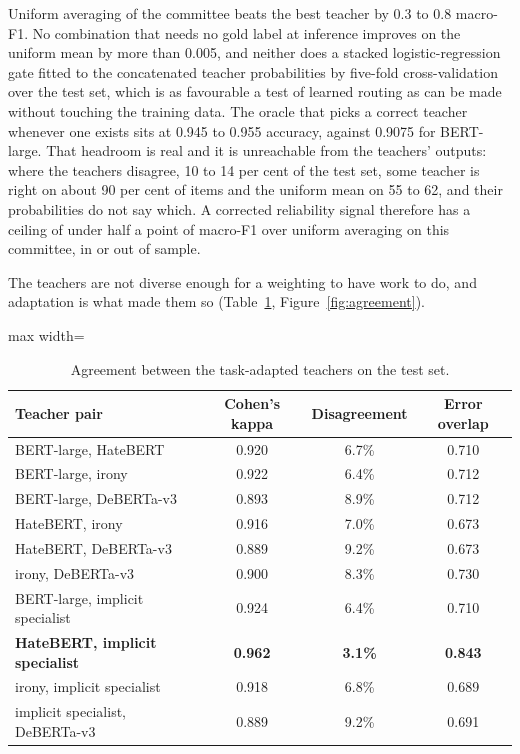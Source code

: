 Uniform averaging of the committee beats the best teacher by 0.3 to 0.8 macro-F1. No combination
that needs no gold label at inference improves on the uniform mean by more than 0.005, and neither
does a stacked logistic-regression gate fitted to the concatenated teacher probabilities by
five-fold cross-validation over the test set, which is as favourable a test of learned routing as
can be made without touching the training data. The oracle that picks a correct teacher whenever one
exists sits at 0.945 to 0.955 accuracy, against 0.9075 for BERT-large. That headroom is real and it
is unreachable from the teachers' outputs: where the teachers disagree, 10 to 14 per cent of the
test set, some teacher is right on about 90 per cent of items and the uniform mean on 55 to 62, and
their probabilities do not say which. A corrected reliability signal therefore has a ceiling of
under half a point of macro-F1 over uniform averaging on this committee, in or out of sample.

The teachers are not diverse enough for a weighting to have work to do, and adaptation is what made
them so (Table~\ref{tab:agreement}, Figure~\ref{fig:agreement}).

\begin{table}[htbp]
\centering
\small
\caption{Agreement between the task-adapted teachers on the test set.}
\label{tab:agreement}
\begin{adjustbox}{max width=\textwidth}
\begin{tabular}{lccc}
\toprule
Teacher pair & Cohen's kappa & Disagreement & Error overlap \\
\midrule
BERT-large, HateBERT & 0.920 & 6.7\% & 0.710 \\
BERT-large, irony & 0.922 & 6.4\% & 0.712 \\
BERT-large, DeBERTa-v3 & 0.893 & 8.9\% & 0.712 \\
HateBERT, irony & 0.916 & 7.0\% & 0.673 \\
HateBERT, DeBERTa-v3 & 0.889 & 9.2\% & 0.673 \\
irony, DeBERTa-v3 & 0.900 & 8.3\% & 0.730 \\
BERT-large, implicit specialist & 0.924 & 6.4\% & 0.710 \\
\textbf{HateBERT, implicit specialist} & \textbf{0.962} & \textbf{3.1\%} & \textbf{0.843} \\
irony, implicit specialist & 0.918 & 6.8\% & 0.689 \\
implicit specialist, DeBERTa-v3 & 0.889 & 9.2\% & 0.691 \\
\bottomrule
\end{tabular}
\end{adjustbox}
\end{table}

